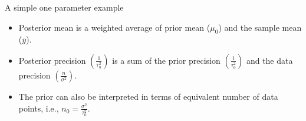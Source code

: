 \documentclass{beamer}
\begin{document}
\begin{frame}{A simple one parameter example}

\vspace{-0.1in}
\begin{footnotesize}
\begin{itemize}
\item Posterior mean is a weighted average of prior mean ($\mu_0$) and the sample mean ($\overline{y}$).
\item Posterior precision $\left(\frac{1}{\tau_n^2}\right)$ is a sum of the prior precision $\left(\frac{1}{\tau_0^2}\right)$ and the data precision $\left(\frac{n}{\sigma^2}\right)$.
\item The prior can also be interpreted in terms of equivalent number of data points, i.e., $n_0 = \frac{\sigma^2}{\tau_0^2}$.
\end{itemize}
\end{footnotesize}
\vspace{-0.5in}

\end{frame}
\end{document}
